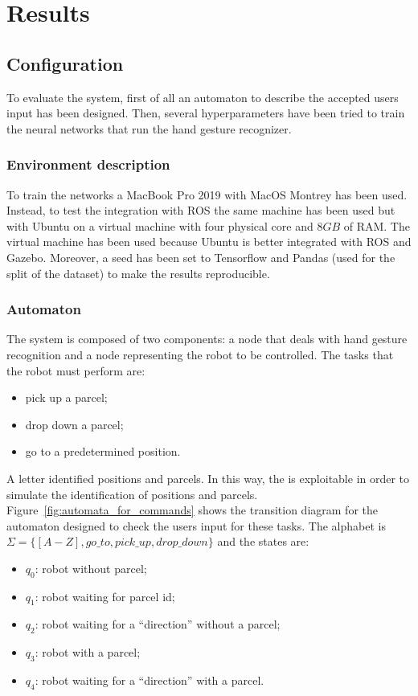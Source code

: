 \documentclass[../thesis.tex]{subfiles}
\begin{document}
\chapter{Results}\label{cap:results}
\section{Configuration}
To evaluate the system, first of all an automaton to describe the accepted users input has been designed. Then, several hyperparameters have been tried to train the neural networks that run the hand gesture recognizer.

\subsection{Environment description}
To train the networks a MacBook Pro 2019 with MacOS Montrey has been used. Instead, to test the integration with ROS the same machine has been used but with Ubuntu on a virtual machine with four physical core and $8GB$ of RAM. The virtual machine has been used because Ubuntu is better integrated with \acrshort{ROS} and Gazebo. Moreover, a seed has been set to Tensorflow and Pandas (used for the split of the dataset) to make the results reproducible.

\subsection{Automaton}\label{ss:automaton_description}
The system is composed of two components: a node that deals with  hand gesture recognition and a node representing the robot to be controlled. The tasks that the robot must perform are:
\begin{itemize}
    \item pick up a parcel;
    \item drop down a parcel;
    \item go to a predetermined position.
\end{itemize}
A letter identified positions and parcels. In this way, the  is exploitable in order to simulate the identification of positions and parcels.\\
Figure~\ref{fig:automata_for_commands} shows the transition diagram for the automaton designed to check the users input for these tasks. The alphabet is $\Sigma = \{[A-Z], go\_to, pick\_up, drop\_down\}$ and the states are:
\begin{itemize}
    \item \textbf{$q_0$}: robot without parcel; 
    \item \textbf{$q_1$}: robot waiting for parcel id; 
    \item \textbf{$q_2$}: robot waiting for a ``direction'' without a parcel;
    \item \textbf{$q_3$}: robot with a parcel;
    \item \textbf{$q_4$}: robot waiting for a ``direction'' with a parcel.
\end{itemize}
\end{document}
